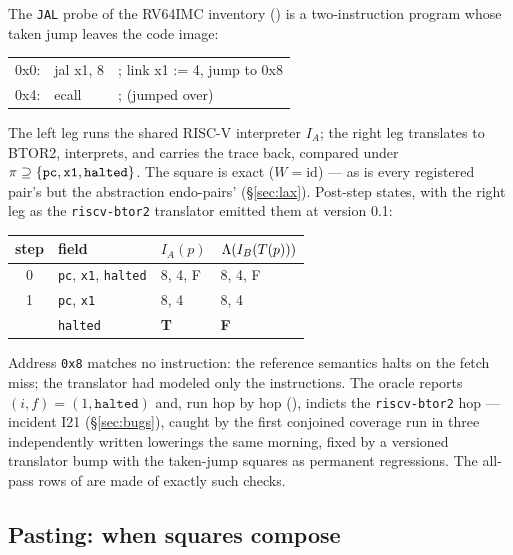\begin{genexample}
The \texttt{JAL} probe of the RV64IMC inventory
() is a two-instruction program whose taken jump
leaves the code image:
\begin{center}
\footnotesize\ttfamily
\begin{tabular}{@{}lll@{}}
0x0: & jal x1, 8 & ; link x1 := 4, jump to 0x8 \\
0x4: & ecall     & ; (jumped over) \\
\end{tabular}
\end{center}
The left leg runs the shared RISC-V interpreter $I_A$; the right leg
translates to BTOR2, interprets, and carries the trace back, compared
under $\pi \supseteq \{\texttt{pc}, \texttt{x1}, \texttt{halted}\}$.
The square is exact ($W = \mathrm{id}$) --- as is every registered
pair's but the abstraction endo-pairs' (\S\ref{sec:lax}).
Post-step states, with the right leg as the
\texttt{riscv-btor2} translator emitted them at version 0.1:
\begin{center}
\footnotesize
\begin{tabular}{@{}clll@{}}
\toprule
step & field & $I_A(p)$ & $\Lambda(I_B(T(p)))$ \\
\midrule
0 & \texttt{pc}, \texttt{x1}, \texttt{halted} & 8, 4, F & 8, 4, F \\
1 & \texttt{pc}, \texttt{x1} & 8, 4 & 8, 4 \\
  & \texttt{halted} & \textbf{T} & \textbf{F} \\
\bottomrule
\end{tabular}
\end{center}
Address \texttt{0x8} matches no instruction: the reference semantics
halts on the fetch miss; the translator had modeled only the
instructions. The oracle reports $(i, f) = (1, \texttt{halted})$ and,
run hop by hop (), indicts the
\texttt{riscv-btor2} hop --- incident I21 (\S\ref{sec:bugs}), caught
by the first conjoined coverage run in three independently written
lowerings the same morning, fixed by a versioned translator bump with
the taken-jump squares as permanent regressions. The all-pass rows of
 are made of exactly such checks.
\end{genexample}

\subsection{Pasting: when squares compose}
\label{sec:pasting}


